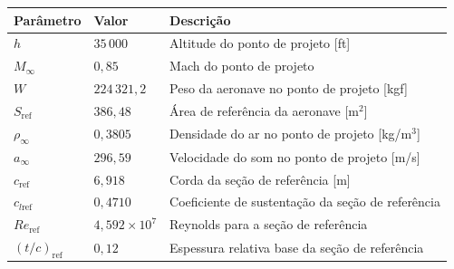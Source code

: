 \begin{tabular}{lll}
\toprule
Parâmetro & Valor & Descrição \\
\midrule
$h$ & $35\,000$ & Altitude do ponto de projeto [ft] \\
$M_{\infty}$ & $0{,}85$ & Mach do ponto de projeto \\
$W$ & $224\,321{,}2$ & Peso da aeronave no ponto de projeto [kgf] \\
$S_{\mathrm{ref}}$ & $386{,}48$ & Área de referência da aeronave [m$^2$] \\
$\rho_{\infty}$ & $0{,}3805$ & Densidade do ar no ponto de projeto [kg/m$^3$] \\
$a_{\infty}$ & $296{,}59$ & Velocidade do som no ponto de projeto [m/s] \\
$c_{\mathrm{ref}}$ & $6{,}918$ & Corda da seção de referência [m] \\
$c_{l\mathrm{ref}}$ & $0{,}4710$ & Coeficiente de sustentação da seção de referência \\
$Re_{\mathrm{ref}}$ & $4{,}592 \times 10^{7}$ & Reynolds para a seção de referência \\
$(t/c)_{\mathrm{ref}}$ & $0{,}12$ & Espessura relativa base da seção de referência \\
\bottomrule
\end{tabular}
